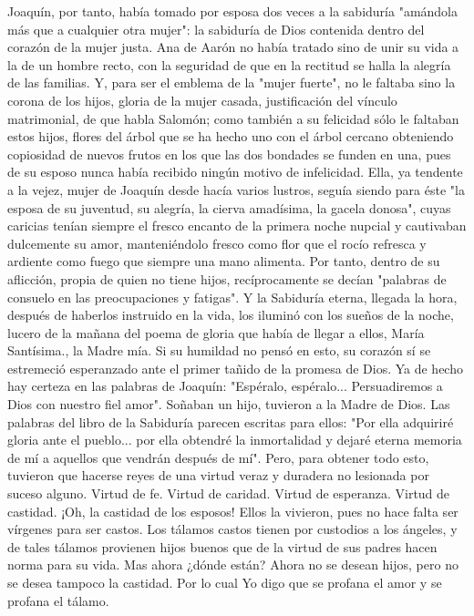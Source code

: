 \documentclass[12pt]{book} %
\begin{document}
Joaquín, por tanto, había tomado por esposa dos veces a la sabiduría "amándola más que a cualquier otra mujer": la 
sabiduría de Dios contenida dentro del corazón de la mujer justa. Ana de Aarón no había tratado sino de unir su vida a la de un hombre recto, con la seguridad de que en la rectitud se halla la alegría de las familias. Y, para ser el emblema de la "mujer fuerte", no le faltaba sino la corona de los hijos, gloria de la mujer casada, justificación del vínculo matrimonial, de que habla Salomón; como también a su felicidad sólo le faltaban estos hijos, flores del árbol que se ha hecho uno con el árbol cercano obteniendo copiosidad de nuevos frutos en los que las dos bondades se funden en una, pues de su esposo nunca había recibido ningún motivo de infelicidad. 
Ella, ya tendente a la vejez, mujer de Joaquín desde hacía varios lustros, seguía siendo para éste "la esposa de su 
juventud, su alegría, la cierva amadísima, la gacela donosa", cuyas caricias tenían siempre el fresco encanto de la primera noche nupcial y cautivaban dulcemente su amor, manteniéndolo fresco como flor que el rocío refresca y ardiente como fuego que siempre una mano alimenta. Por tanto, dentro de su aflicción, propia de quien no tiene hijos, recíprocamente se decían "palabras de consuelo en las preocupaciones y fatigas". 
Y la Sabiduría eterna, llegada la hora, después de haberlos instruido en la vida, los iluminó con los sueños de la noche, 
lucero de la mañana del poema de gloria que había de llegar a ellos, María Santísima., la Madre mía. Si su humildad no pensó en esto, su corazón sí se estremeció esperanzado ante el primer tañido de la promesa de Dios. Ya de hecho hay certeza en las palabras de Joaquín: "Espéralo, espéralo... Persuadiremos a Dios con nuestro fiel amor". Soñaban un hijo, tuvieron a la Madre de Dios. 
Las palabras del libro de la Sabiduría parecen escritas para ellos: "Por ella adquiriré gloria ante el pueblo... por ella 
obtendré la inmortalidad y dejaré eterna memoria de mí a aquellos que vendrán después de mí". Pero, para obtener todo esto, tuvieron que hacerse reyes de una virtud veraz y duradera no lesionada por suceso alguno. Virtud de fe. Virtud de caridad. Virtud de esperanza. Virtud de castidad. ¡Oh, la castidad de los esposos! Ellos la vivieron, pues no hace falta ser vírgenes para ser castos. Los tálamos castos tienen por custodios a los ángeles, y de tales tálamos provienen hijos buenos que de la virtud de sus padres hacen norma para su vida. 
Mas ahora ¿dónde están? Ahora no se desean hijos, pero no se desea tampoco la castidad. Por lo cual Yo digo que se 
profana el amor y se profana el tálamo. 
\end{document}

